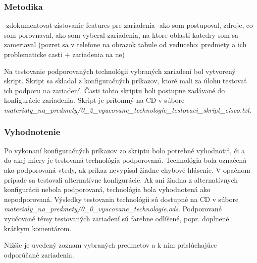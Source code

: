\subsubsection{Metodika}

-zdokumentovat zistovanie features pre zariadenia
        -ako som postupoval, zdroje, co som porovnaval, ako som vyberal zariadenia, na ktore oblasti katedry som sa zameriaval (pozret sa v telefone na obrazok tabule od veduceho: predmety a ich problematicke casti + zariadenia na ne)

Na testovanie podporovaných technológii vybraných zariadení bol vytvorený skript. Skript sa skladal z konfiguračných príkazov, ktoré mali za úlohu testovať ich podporu na zariadení. Časti tohto skriptu boli postupne zadávané do konfigurácie zariadenia. Skript je prítomný na CD v súbore \\
\emph{materialy\_na\_predmety/0\_2\_vyucovane\_technologie\_testovaci\_skript\_cisco.txt}.



\subsubsection{Vyhodnotenie}

Po vykonaní konfiguračných príkazov zo skriptu bolo potrebné vyhodnotiť, či a do akej miery je testovaná technológia podporovaná. Technológia bola označená ako podporovaná vtedy, ak príkaz nevypísal žiadne chybové hlásenie. V opačnom prípade sa testovali alternatívne konfigurácie. Ak ani žiadna z alternatívnych konfigurácii nebola podporovaná, technológia bola vyhodnotená ako nepodporovaná. Výsledky testovania technológii sú dostupné na CD v súbore \\
\emph{materialy\_na\_predmety/0\_0\_vyucovane\_technologie.ods}. Podporované vyučované témy testovaných zariadení sú farebne odlíšené, popr. doplnené krátkym komentárom.

Nižšie je uvedený zoznam vybraných predmetov a k nim prislúchajúce odporúčané zariadenia.

